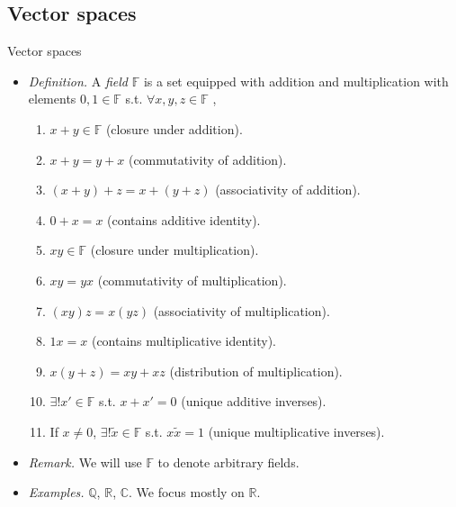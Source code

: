 \documentclass{beamer}
\numberwithin{equation}{section}
\begin{document}
\subsection{Vector spaces}

\begin{frame}{Vector spaces}
    \begin{itemize}
        \item
        \textit{Definition.} A \textit{field} $ \mathbb{F} $ is a set equipped
        with addition and multiplication with elements $ 0, 1 \in \mathbb{F} $
        s.t. $ \forall x, y, z \in \mathbb{F} $ \cite{jacob_linalg},
        \begin{enumerate}
            \item
            $ x + y \in \mathbb{F} $ (closure under addition).

            \item
            $ x + y = y + x $ (commutativity of addition).

            \item
            $ (x + y) + z = x + (y + z) $ (associativity of addition).

            \item
            $ 0 + x = x $ (contains additive identity).

            \item
            $ xy \in \mathbb{F} $ (closure under multiplication).

            \item
            $ xy = yx $ (commutativity of multiplication).

            \item
            $ (xy)z = x(yz) $ (associativity of multiplication).

            \item
            $ 1x = x $ (contains multiplicative identity).

            \item
            $ x(y + z) = xy + xz $ (distribution of multiplication).

            \item
            $ \exists!x' \in \mathbb{F} $ s.t. $ x + x' = 0 $ (unique additive
            inverses).

            \item
            If $ x \ne 0 $, $ \exists!\tilde{x} \in \mathbb{F} $ s.t.
            $ x\tilde{x} = 1 $ (unique multiplicative inverses).
        \end{enumerate}

        \item
        \textit{Remark.} We will use $ \mathbb{F} $ to denote arbitrary fields.

        \item
        \textit{Examples.} $ \mathbb{Q} $, $ \mathbb{R} $, $ \mathbb{C} $. We
        focus mostly on $ \mathbb{R} $.
    \end{itemize}
\end{frame}
\end{document}
